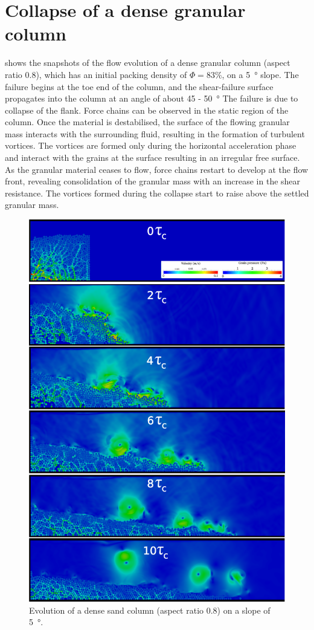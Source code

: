 \documentclass[12pt,twoside]{tuhhproc-en}
\begin{document}
\section{Collapse of a dense granular column}
 shows the snapshots of the flow evolution of a dense granular column (aspect ratio 0.8), which has an initial packing density of $\Phi = 83\%$, on a \SI{5}{\degree} slope. The failure begins at the toe end of the column, and the shear-failure surface propagates into the column at an angle of about 45 - \SI{50}{\degree} The failure is due to collapse of the flank.  Force chains can be observed in the static region of the column. Once the material is destabilised, the surface of the flowing granular mass interacts with the surrounding fluid, resulting in the formation of turbulent vortices. The vortices are formed only during the horizontal acceleration phase and interact with the grains at the surface resulting in an irregular free surface. As the granular material ceases to flow, force chains restart to develop at the flow front, revealing consolidation of the granular mass with an increase in the shear resistance. The vortices formed during the collapse start to raise above the settled granular mass.

\begin{figure}[htpb]
\includegraphics[width=0.97\columnwidth]{figs/dense_s5_r09}
\caption{Evolution of a dense sand column (aspect ratio 0.8) on a slope of \SI{5}{\degree}. }
\label{fig:dense-s5-r09}
\end{figure}
\end{document}
